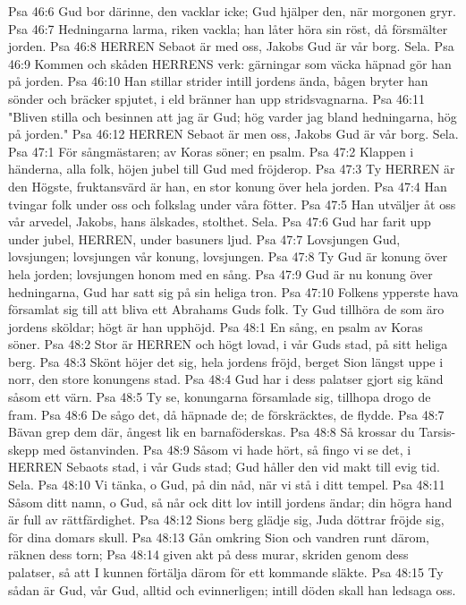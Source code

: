 Psa 46:6  Gud bor därinne, den vacklar icke; Gud hjälper den, när morgonen gryr.
Psa 46:7  Hedningarna larma, riken vackla; han låter höra sin röst, då försmälter jorden.
Psa 46:8  HERREN Sebaot är med oss, Jakobs Gud är vår borg. Sela.
Psa 46:9  Kommen och skåden HERRENS verk: gärningar som väcka häpnad gör han på jorden.
Psa 46:10  Han stillar strider intill jordens ända, bågen bryter han sönder och bräcker spjutet, i eld bränner han upp stridsvagnarna.
Psa 46:11  "Bliven stilla och besinnen att jag är Gud; hög varder jag bland hedningarna, hög på jorden."
Psa 46:12  HERREN Sebaot är men oss, Jakobs Gud är vår borg. Sela.
Psa 47:1  För sångmästaren; av Koras söner; en psalm.
Psa 47:2  Klappen i händerna, alla folk, höjen jubel till Gud med fröjderop.
Psa 47:3  Ty HERREN är den Högste, fruktansvärd är han, en stor konung över hela jorden.
Psa 47:4  Han tvingar folk under oss och folkslag under våra fötter.
Psa 47:5  Han utväljer åt oss vår arvedel, Jakobs, hans älskades, stolthet. Sela.
Psa 47:6  Gud har farit upp under jubel, HERREN, under basuners ljud.
Psa 47:7  Lovsjungen Gud, lovsjungen; lovsjungen vår konung, lovsjungen.
Psa 47:8  Ty Gud är konung över hela jorden; lovsjungen honom med en sång.
Psa 47:9  Gud är nu konung över hedningarna, Gud har satt sig på sin heliga tron.
Psa 47:10  Folkens ypperste hava församlat sig till att bliva ett Abrahams Guds folk. Ty Gud tillhöra de som äro jordens sköldar; högt är han upphöjd.
Psa 48:1  En sång, en psalm av Koras söner.
Psa 48:2  Stor är HERREN och högt lovad, i vår Guds stad, på sitt heliga berg.
Psa 48:3  Skönt höjer det sig, hela jordens fröjd, berget Sion längst uppe i norr, den store konungens stad.
Psa 48:4  Gud har i dess palatser gjort sig känd såsom ett värn.
Psa 48:5  Ty se, konungarna församlade sig, tillhopa drogo de fram.
Psa 48:6  De sågo det, då häpnade de; de förskräcktes, de flydde.
Psa 48:7  Bävan grep dem där, ångest lik en barnaföderskas.
Psa 48:8  Så krossar du Tarsis-skepp med östanvinden.
Psa 48:9  Såsom vi hade hört, så fingo vi se det, i HERREN Sebaots stad, i vår Guds stad; Gud håller den vid makt till evig tid. Sela.
Psa 48:10  Vi tänka, o Gud, på din nåd, när vi stå i ditt tempel.
Psa 48:11  Såsom ditt namn, o Gud, så når ock ditt lov intill jordens ändar; din högra hand är full av rättfärdighet.
Psa 48:12  Sions berg glädje sig, Juda döttrar fröjde sig, för dina domars skull.
Psa 48:13  Gån omkring Sion och vandren runt därom, räknen dess torn;
Psa 48:14  given akt på dess murar, skriden genom dess palatser, så att I kunnen förtälja därom för ett kommande släkte.
Psa 48:15  Ty sådan är Gud, vår Gud, alltid och evinnerligen; intill döden skall han ledsaga oss.
